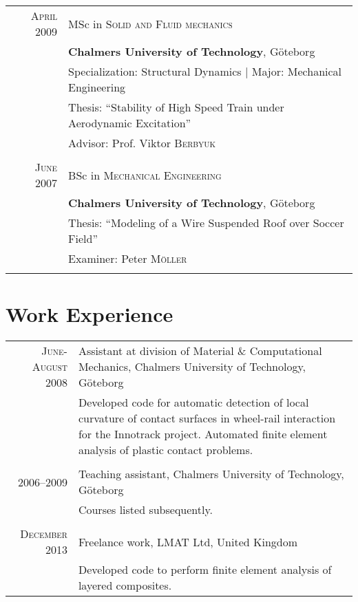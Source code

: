 \documentclass[a4paper,10pt]{article} %
\begin{document}
{\begin{tabular}{rl}

\textsc{April} 2009 & MSc in \textsc{Solid and Fluid mechanics}\\
& \textbf{Chalmers University of Technology}, Göteborg\\
& Specialization: Structural Dynamics | Major: Mechanical Engineering\\
& Thesis: ``Stability of High Speed Train under Aerodynamic Excitation''\\
& \small Advisor: Prof. Viktor \textsc{Berbyuk}\\
&\\


\textsc{June} 2007 & BSc in \textsc{Mechanical Engineering}\\
& \textbf{Chalmers University of Technology}, Göteborg\\
& Thesis: ``Modeling of a Wire Suspended Roof over Soccer Field''\\
& \small Examiner: Peter \textsc{Möller}\\
&\\


\end{tabular}


\section{Work Experience}

\begin{tabular}{r|p{11cm}}
\textsc{June-August 2008} & Assistant at division of Material \& Computational Mechanics, Chalmers University of Technology, Göteborg\\
& \footnotesize{Developed code for automatic detection of local curvature of contact surfaces in wheel-rail interaction for the Innotrack project. Automated finite element analysis of plastic contact problems.}\\
\multicolumn{2}{c}{} \\
\textsc{2006--2009} & Teaching assistant, Chalmers University of Technology, Göteborg\\
& \footnotesize{Courses listed subsequently.}\\
\multicolumn{2}{c}{} \\
\textsc{December 2013} & Freelance work, LMAT Ltd, United Kingdom\\
& \footnotesize{Developed code to perform finite element analysis of layered composites.}\\


\end{tabular}}
\end{document}
